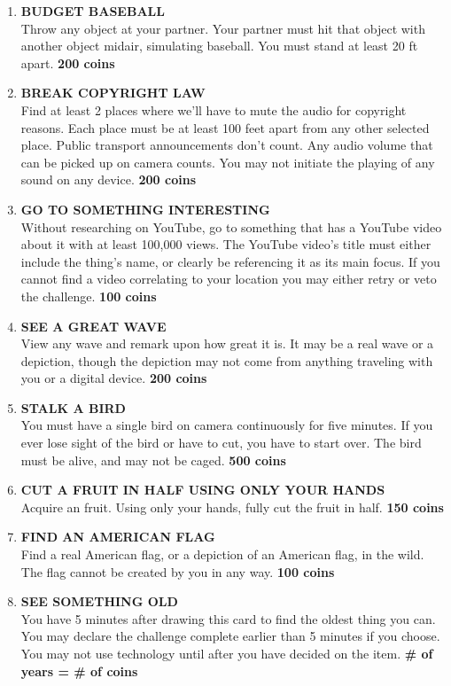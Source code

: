 \documentclass{article}
\begin{document}
\begin{enumerate}
    \item \textbf{BUDGET BASEBALL} \\ Throw any object at your partner. Your partner must hit that object with another object midair, simulating baseball. You must stand at least 20 ft apart. \textbf{200 coins}
    \item \textbf{BREAK COPYRIGHT LAW}\\ Find at least 2 places where we'll have to mute the audio for copyright reasons. Each place must be at least 100 feet apart from any other selected place. Public transport announcements don't count. Any audio volume that can be picked up on camera counts. You may not initiate the playing of any sound on any device. \textbf{200 coins}
    \item \textbf{GO TO SOMETHING INTERESTING} \\ Without researching on YouTube, go to something that has a YouTube video about it with at least 100,000 views. The YouTube video's title must either include the thing's name, or clearly be referencing it as its main focus. If you cannot find a video correlating to your location you may either retry or veto the challenge. \textbf{100 coins}
    \item \textbf{SEE A GREAT WAVE} \\ View any wave and remark upon how great it is. It may be a real wave or a depiction, though the depiction may not come from anything traveling with you or a digital device. \textbf{200 coins}
    \item \textbf{STALK A BIRD} \\ You must have a single bird on camera continuously for five minutes. If you ever lose sight of the bird or have to cut, you have to start over. The bird must be alive, and may not be caged. \textbf{500 coins}
    \item \textbf{CUT A FRUIT IN HALF USING ONLY YOUR HANDS} \\ Acquire an fruit. Using only your hands, fully cut the fruit in half. \textbf{150 coins}
    \item \textbf{FIND AN AMERICAN FLAG} \\
    Find a real American flag, or a depiction of an American flag, in the wild. The flag cannot be created by you in any way. \textbf{100 coins}
    \item \textbf{SEE SOMETHING OLD} \\ You have 5 minutes after drawing this card to find the oldest thing you can. You may declare the challenge complete earlier than 5 minutes if you choose. You may not use technology until after you have decided on the item. \textbf{\# of years = \# of coins}

\end{enumerate}
\end{document}

